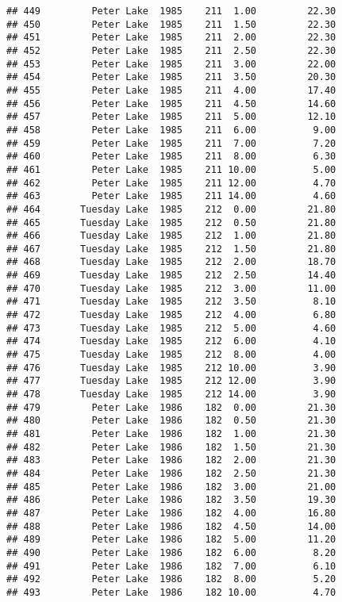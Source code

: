 \documentclass[
]{article}
\begin{document}
\begin{verbatim}
## 449         Peter Lake  1985    211  1.00         22.30
## 450         Peter Lake  1985    211  1.50         22.30
## 451         Peter Lake  1985    211  2.00         22.30
## 452         Peter Lake  1985    211  2.50         22.30
## 453         Peter Lake  1985    211  3.00         22.00
## 454         Peter Lake  1985    211  3.50         20.30
## 455         Peter Lake  1985    211  4.00         17.40
## 456         Peter Lake  1985    211  4.50         14.60
## 457         Peter Lake  1985    211  5.00         12.10
## 458         Peter Lake  1985    211  6.00          9.00
## 459         Peter Lake  1985    211  7.00          7.20
## 460         Peter Lake  1985    211  8.00          6.30
## 461         Peter Lake  1985    211 10.00          5.00
## 462         Peter Lake  1985    211 12.00          4.70
## 463         Peter Lake  1985    211 14.00          4.60
## 464       Tuesday Lake  1985    212  0.00         21.80
## 465       Tuesday Lake  1985    212  0.50         21.80
## 466       Tuesday Lake  1985    212  1.00         21.80
## 467       Tuesday Lake  1985    212  1.50         21.80
## 468       Tuesday Lake  1985    212  2.00         18.70
## 469       Tuesday Lake  1985    212  2.50         14.40
## 470       Tuesday Lake  1985    212  3.00         11.00
## 471       Tuesday Lake  1985    212  3.50          8.10
## 472       Tuesday Lake  1985    212  4.00          6.80
## 473       Tuesday Lake  1985    212  5.00          4.60
## 474       Tuesday Lake  1985    212  6.00          4.10
## 475       Tuesday Lake  1985    212  8.00          4.00
## 476       Tuesday Lake  1985    212 10.00          3.90
## 477       Tuesday Lake  1985    212 12.00          3.90
## 478       Tuesday Lake  1985    212 14.00          3.90
## 479         Peter Lake  1986    182  0.00         21.30
## 480         Peter Lake  1986    182  0.50         21.30
## 481         Peter Lake  1986    182  1.00         21.30
## 482         Peter Lake  1986    182  1.50         21.30
## 483         Peter Lake  1986    182  2.00         21.30
## 484         Peter Lake  1986    182  2.50         21.30
## 485         Peter Lake  1986    182  3.00         21.00
## 486         Peter Lake  1986    182  3.50         19.30
## 487         Peter Lake  1986    182  4.00         16.80
## 488         Peter Lake  1986    182  4.50         14.00
## 489         Peter Lake  1986    182  5.00         11.20
## 490         Peter Lake  1986    182  6.00          8.20
## 491         Peter Lake  1986    182  7.00          6.10
## 492         Peter Lake  1986    182  8.00          5.20
## 493         Peter Lake  1986    182 10.00          4.70

\end{verbatim}
\end{document}
